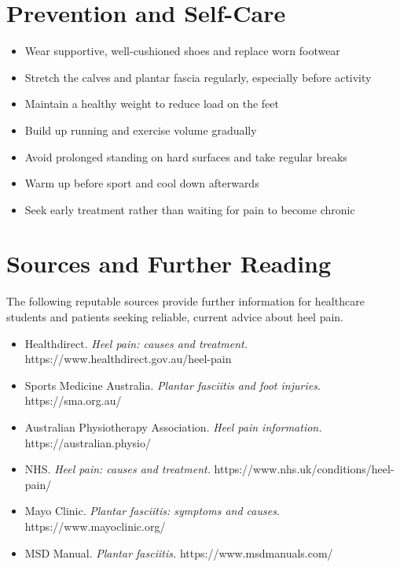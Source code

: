\section*{Prevention and Self-Care}
\begin{itemize}
    \item Wear supportive, well-cushioned shoes and replace worn footwear
    \item Stretch the calves and plantar fascia regularly, especially before activity
    \item Maintain a healthy weight to reduce load on the feet
    \item Build up running and exercise volume gradually
    \item Avoid prolonged standing on hard surfaces and take regular breaks
    \item Warm up before sport and cool down afterwards
    \item Seek early treatment rather than waiting for pain to become chronic
\end{itemize}

\section*{Sources and Further Reading}
The following reputable sources provide further information for healthcare students and patients seeking reliable, current advice about heel pain.

\begin{itemize}
    \item Healthdirect. \textit{Heel pain: causes and treatment.} https://www.healthdirect.gov.au/heel-pain
    \item Sports Medicine Australia. \textit{Plantar fasciitis and foot injuries.} https://sma.org.au/
    \item Australian Physiotherapy Association. \textit{Heel pain information.} https://australian.physio/
    \item NHS. \textit{Heel pain: causes and treatment.} https://www.nhs.uk/conditions/heel-pain/
    \item Mayo Clinic. \textit{Plantar fasciitis: symptoms and causes.} https://www.mayoclinic.org/
    \item MSD Manual. \textit{Plantar fasciitis.} https://www.msdmanuals.com/
\end{itemize}
